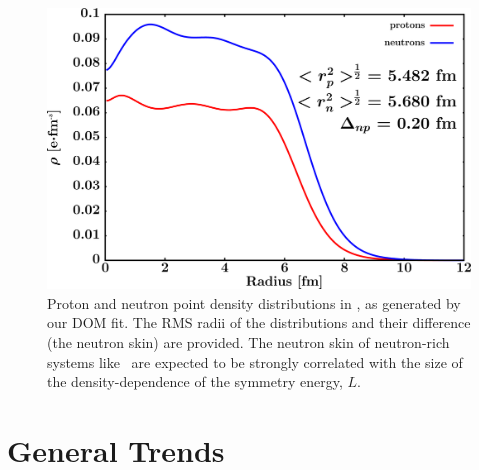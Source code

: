 \begin{figure}[tb]
    \centering
    \includegraphics[width=\textwidth]{figures/pb208_matterDensity.png}
    \caption[Proton and neutron matter density distributions in \pbEight]
    {
        Proton and neutron point density distributions in \pbEight, as
        generated by our DOM fit. The RMS radii of the distributions and their
        difference (the neutron skin) are provided. The neutron skin of
        neutron-rich systems like \pbEight\ are expected to be strongly correlated
        with the size of the density-dependence of the symmetry energy, $L$.
    }
    \label{Pb208MatterDistribution}
\end{figure}

\section{General Trends}
